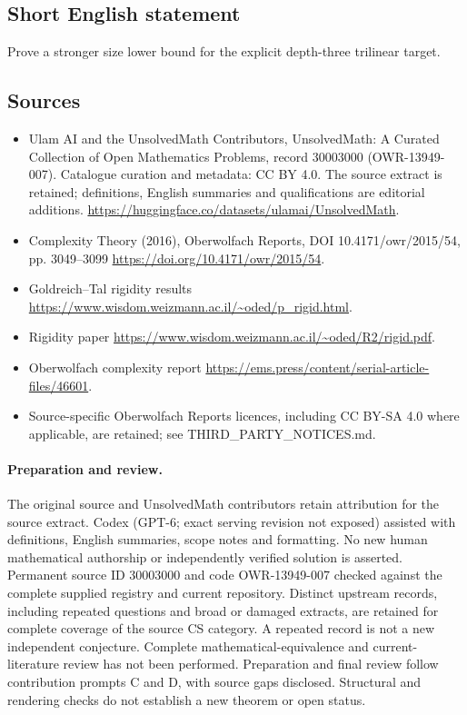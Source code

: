\documentclass[11pt]{article}
\begin{document}
\subsection{Short English statement}
Prove a stronger size lower bound for the explicit depth-three trilinear target.
\subsection{Sources}
\begin{itemize}
\item[\hypertarget{source:30003000:1}{S1}] Ulam AI and the UnsolvedMath Contributors, UnsolvedMath: A Curated Collection of Open Mathematics Problems, record 30003000 (OWR-13949-007). Catalogue curation and metadata: CC BY 4.0. The source extract is retained; definitions, English summaries and qualifications are editorial additions.
\url{https://huggingface.co/datasets/ulamai/UnsolvedMath}.
\item[\hypertarget{source:30003000:2}{S2}] Complexity Theory (2016), Oberwolfach Reports, DOI 10.4171/owr/2015/54, pp. 3049--3099
\url{https://doi.org/10.4171/owr/2015/54}.
\item[\hypertarget{source:30003000:3}{S3}] Goldreich--Tal rigidity results
\url{https://www.wisdom.weizmann.ac.il/~oded/p_rigid.html}.
\item[\hypertarget{source:30003000:4}{S4}] Rigidity paper
\url{https://www.wisdom.weizmann.ac.il/~oded/R2/rigid.pdf}.
\item[\hypertarget{source:30003000:5}{S5}] Oberwolfach complexity report
\url{https://ems.press/content/serial-article-files/46601}.
\item Source-specific Oberwolfach Reports licences, including CC BY-SA 4.0 where applicable, are retained; see THIRD\_PARTY\_NOTICES.md.
\end{itemize}
\paragraph{Preparation and review.}
The original source and UnsolvedMath contributors retain attribution for the source extract. Codex (GPT-6; exact serving revision not exposed) assisted with definitions, English summaries, scope notes and formatting. No new human mathematical authorship or independently verified solution is asserted. Permanent source ID 30003000 and code OWR-13949-007 checked against the complete supplied registry and current repository. Distinct upstream records, including repeated questions and broad or damaged extracts, are retained for complete coverage of the source CS category. A repeated record is not a new independent conjecture. Complete mathematical-equivalence and current-literature review has not been performed. Preparation and final review follow contribution prompts C and D, with source gaps disclosed. Structural and rendering checks do not establish a new theorem or open status.
\label{end:30003000}
\end{document}
